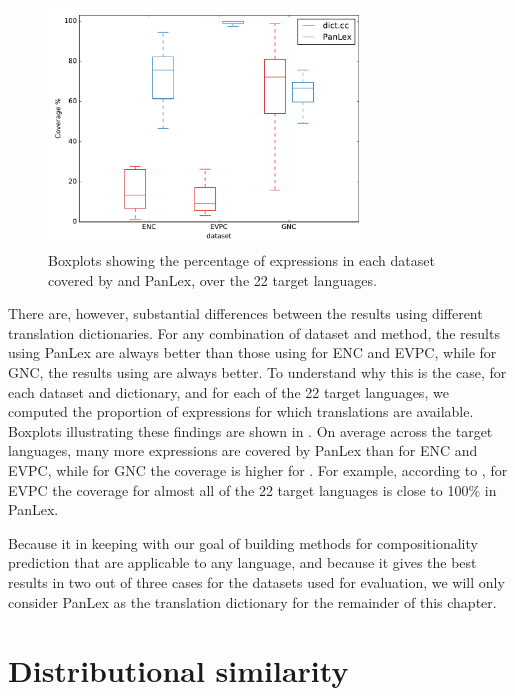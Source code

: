 \documentclass[output=paper,modfonts,nonflat]{langsci/langscibook}
\begin{document}
\begin{figure}[t]
\begin{center}
  \includegraphics[width=0.75\textwidth]{figures/coverage-boxplot.pdf}
\caption{Boxplots showing the percentage of expressions in each
  dataset covered by \dictcc and PanLex, over the 22 target
  languages.\label{fig:ccdict:coverage}}
\end{center}
\end{figure}

There are, however, substantial differences between the results using
different translation dictionaries. For any combination of dataset and
method, the results using PanLex are always better than those using
\dictcc for ENC and EVPC, while for GNC, the results using \dictcc are
always better. To understand why this is the case, for each dataset 
and dictionary, and for each of the 22 target languages, we computed the 
proportion of expressions for which translations are
available. Boxplots illustrating these findings are shown in
. On average across the target languages,
many more expressions are covered by PanLex than \dictcc for ENC and
EVPC, while for GNC the coverage is higher for \dictcc. For example,
according to , for EVPC the coverage for
almost all of the 22 target languages is close to 100\% in PanLex.

Because it in keeping with our goal of building methods for
compositionality prediction that are applicable to any language, and
because it gives the best results in two out of three cases for the
datasets used for evaluation, we will only consider PanLex as the
translation dictionary for the remainder of this chapter.


\section{Distributional similarity\label{sec:distsim}}
\end{document}
